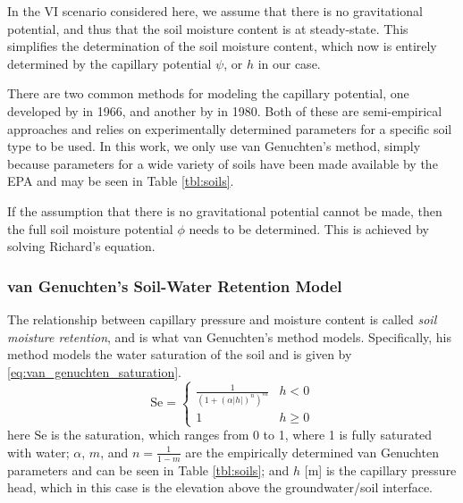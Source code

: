 In the VI scenario considered here, we assume that there is no gravitational potential, and thus that the soil moisture content is at steady-state.
This simplifies the determination of the soil moisture content, which now is entirely determined by the capillary potential $\psi$, or $h$ in our case.\par

There are two common methods for modeling the capillary potential, one developed by \citeauthor{brooks_properties_1966}\cite{brooks_properties_1966} in 1966, and another by \citeauthor{van_genuchten_closed-form_1980}\cite{van_genuchten_closed-form_1980} in 1980.
Both of these are semi-empirical approaches and relies on experimentally determined parameters for a specific soil type to be used.
In this work, we only use van Genuchten's method, simply because parameters for a wide variety of soils have been made available by the EPA and may be seen in Table \ref{tbl:soils}.\par

If the assumption that there is no gravitational potential cannot be made, then the full soil moisture potential $\phi$ needs to be determined.
This is achieved by solving Richard's equation.\par %

\subsubsection{van Genuchten's Soil-Water Retention Model}

The relationship between capillary pressure and moisture content is called \textit{soil moisture retention}, and is what van Genuchten's method models.
Specifically, his method models the water saturation of the soil and is given by \eqref{eq:van_genuchten_saturation}.
\begin{equation}\label{eq:van_genuchten_saturation}
  \mathrm{Se} =
    \begin{cases}
      \frac{1}{(1 + (\alpha |h|)^n)^m} & h < 0 \\
    1 & h \geq 0
    \end{cases}
\end{equation}
here $\mathrm{Se}$ is the saturation, which ranges from 0 to 1, where 1 is fully saturated with water;
$\alpha$, $m$, and $n=\frac{1}{1-m}$ are the empirically determined van Genuchten parameters and can be seen in Table \ref{tbl:soils};
and $h$ [\si{\metre}] is the capillary pressure head, which in this case is the elevation above the groundwater/soil interface.\par

